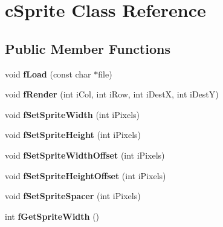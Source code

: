 \hypertarget{classc_sprite}{\section{c\-Sprite Class Reference}
\label{classc_sprite}
}
\subsection*{Public Member Functions}
\begin{DoxyCompactItemize}
\item 
\hypertarget{classc_sprite_a83f6cccb37f09df84aca31c6d6370fea}{void {\bfseries f\-Load} (const char $\ast$file)}\label{classc_sprite_a83f6cccb37f09df84aca31c6d6370fea}

\item 
\hypertarget{classc_sprite_a34b4cbf7e9c2bc5017628f83f9182529}{void {\bfseries f\-Render} (int i\-Col, int i\-Row, int i\-Dest\-X, int i\-Dest\-Y)}\label{classc_sprite_a34b4cbf7e9c2bc5017628f83f9182529}

\item 
\hypertarget{classc_sprite_aaae9b0ff3031c0a5d8a4e21b3d7431bc}{void {\bfseries f\-Set\-Sprite\-Width} (int i\-Pixels)}\label{classc_sprite_aaae9b0ff3031c0a5d8a4e21b3d7431bc}

\item 
\hypertarget{classc_sprite_a77fc288cc44fa79fbab13bea705146fd}{void {\bfseries f\-Set\-Sprite\-Height} (int i\-Pixels)}\label{classc_sprite_a77fc288cc44fa79fbab13bea705146fd}

\item 
\hypertarget{classc_sprite_a921d6b5c47fba92255f37aff598d102a}{void {\bfseries f\-Set\-Sprite\-Width\-Offset} (int i\-Pixels)}\label{classc_sprite_a921d6b5c47fba92255f37aff598d102a}

\item 
\hypertarget{classc_sprite_a8f50fa8cc54b0b4f0b1207c335596b3c}{void {\bfseries f\-Set\-Sprite\-Height\-Offset} (int i\-Pixels)}\label{classc_sprite_a8f50fa8cc54b0b4f0b1207c335596b3c}

\item 
\hypertarget{classc_sprite_abc08170b8a732dd2efe966f096025b3f}{void {\bfseries f\-Set\-Sprite\-Spacer} (int i\-Pixels)}\label{classc_sprite_abc08170b8a732dd2efe966f096025b3f}

\item 
\hypertarget{classc_sprite_aa98bb76898e040e1c6dae95758e073b1}{int {\bfseries f\-Get\-Sprite\-Width} ()}\label{classc_sprite_aa98bb76898e040e1c6dae95758e073b1}


\end{DoxyCompactItemize}

